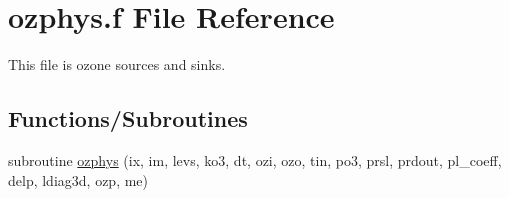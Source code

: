 \hypertarget{ozphys_8f}{}\section{ozphys.\+f File Reference}
\label{ozphys_8f}


This file is ozone sources and sinks.  


\subsection*{Functions/\+Subroutines}
\textbf{ }\par
\begin{DoxyCompactItemize}
\item 
subroutine \hyperlink{group___g_f_s__ozn_ga1994c35a0e329143943d83bd22ee9497}{ozphys} (ix, im, levs, ko3, dt, ozi, ozo, tin, po3, prsl, prdout, pl\+\_\+coeff, delp, ldiag3d, ozp, me)
\end{DoxyCompactItemize}

